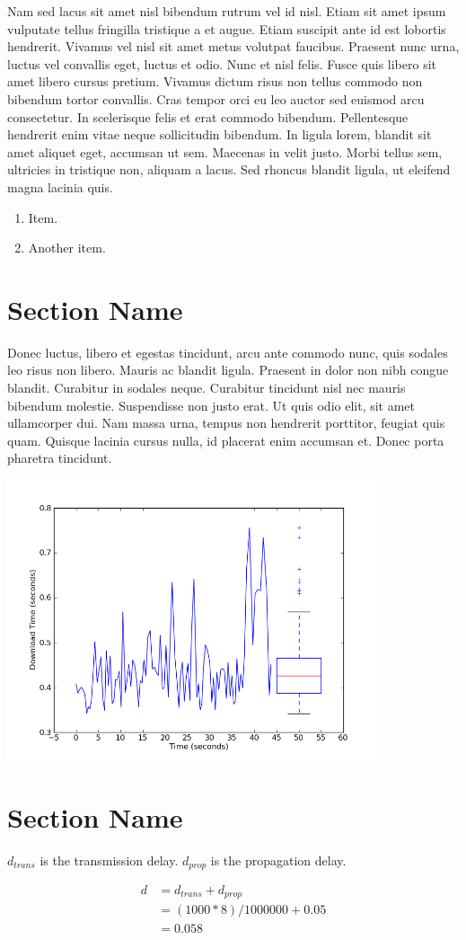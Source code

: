 \documentclass[fleqn,11pt]{article}
\begin{document}
Nam sed lacus sit amet nisl bibendum rutrum vel id nisl. Etiam sit
amet ipsum vulputate tellus fringilla tristique a et augue. Etiam
suscipit ante id est lobortis hendrerit. Vivamus vel nisl sit amet
metus volutpat faucibus. Praesent nunc urna, luctus vel convallis
eget, luctus et odio. Nunc et nisl felis. Fusce quis libero sit amet
libero cursus pretium. Vivamus dictum risus non tellus commodo non
bibendum tortor convallis. Cras tempor orci eu leo auctor sed euismod
arcu consectetur. In scelerisque felis et erat commodo
bibendum. Pellentesque hendrerit enim vitae neque sollicitudin
bibendum. In ligula lorem, blandit sit amet aliquet eget, accumsan ut
sem. Maecenas in velit justo. Morbi tellus sem, ultricies in tristique
non, aliquam a lacus. Sed rhoncus blandit ligula, ut eleifend magna
lacinia quis.

\begin{enumerate}

\item Item.

\item Another item.

\end{enumerate}

\section{Section Name}

Donec luctus, libero et egestas tincidunt, arcu ante commodo nunc,
quis sodales leo risus non libero. Mauris ac blandit ligula. Praesent
in dolor non nibh congue blandit. Curabitur in sodales
neque. Curabitur tincidunt nisl nec mauris bibendum
molestie. Suspendisse non justo erat. Ut quis odio elit, sit amet
ullamcorper dui. Nam massa urna, tempus non hendrerit porttitor,
feugiat quis quam. Quisque lacinia cursus nulla, id placerat enim
accumsan et. Donec porta pharetra tincidunt.

\includegraphics[width=11cm]{graphs/download-combined}

\section{Section Name}

$d_{trans}$ is the transmission delay. $d_{prop}$ is the propagation delay.

\begin{align*}
d &= d_{trans} + d_{prop}\\
  &= (1000*8)/1000000 + 0.05\\
  &= 0.058
\end{align*}
\end{document}
